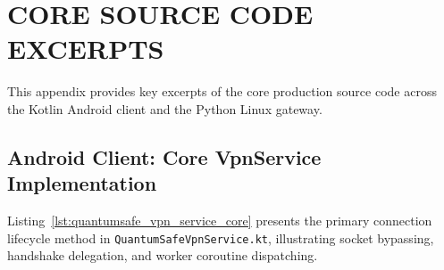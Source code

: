 
\chapter{CORE SOURCE CODE EXCERPTS}
\label{app:source_excerpts}

This appendix provides key excerpts of the core production source code across the Kotlin Android client and the Python Linux gateway.

\section{Android Client: Core VpnService Implementation}

Listing~\ref{lst:quantumsafe_vpn_service_core} presents the primary connection lifecycle method in \texttt{QuantumSafeVpnService.kt}, illustrating socket bypassing, handshake delegation, and worker coroutine dispatching.

